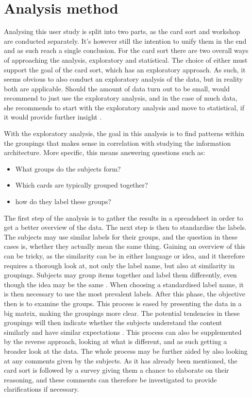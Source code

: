 \section{Analysis method}
\label{AnalysisMethod}
Analysing this user study is split into two parts, as the card sort and workshop are conducted separately. It's however still the intention to unify them in the end and as such reach a single conclusion. For the card sort there are two overall ways of approaching the analysis, exploratory and statistical. The choice of either must support the goal of the card sort, which has an exploratory approach. As such, it seems obvious to also conduct an exploratory analysis of the data, but in reality both are applicable. Should the amount of data turn out to be small, \textcite{WEB:DonnaSpencer} would recommend to just use the exploratory analysis, and in the case of much data, she recommends to start with the exploratory analysis and move to statistical, if it would provide further insight \parencite[][177]{WEB:DonnaSpencer}.

With the exploratory analysis, the goal in this analysis is to find patterns within the groupings that makes sense in correlation with studying the information architecture. More specific, this means answering questions such as:
%
\begin{itemize}
	\item What groups do the subjects form?
	\item Which cards are typically grouped together?
	\item how do they label these groups?
\end{itemize}
%
\noindent
The first step of the analysis is to gather the results in a spreadsheet in order to get a better overview of the data. The next step is then to standardise the labels. The subjects may use similar labels for their groups, and the question in these cases is, whether they actually mean the same thing. Gaining an overview of this can be tricky, as the similarity can be in either language or idea, and it therefore requires a thorough look at, not only the label name, but also at similarity in groupings. Subjects may group items together and label them differently, even though the idea may be the same \parencite[][184]{WEB:DonnaSpencer}. When choosing a standardised label name, it is then necessary to use the most prevalent labels. After this phase, the objective then is to examine the groups. This process is eased by presenting the data in a big matrix, making the groupings more clear. The potential tendencies in these groupings will then indicate whether the subjects understand the content similarly and have similar expectations \parencite[][191]{WEB:DonnaSpencer}. This process can also be supplemented by the reverse approach, looking at what is different, and as such getting a broader look at the data. The whole process may be further aided by also looking at any comments given by the subjects. As it has already been mentioned, the card sort is followed by a survey giving them a chance to elaborate on their reasoning, and these comments can therefore be investigated to provide clarifications if necessary. \\

